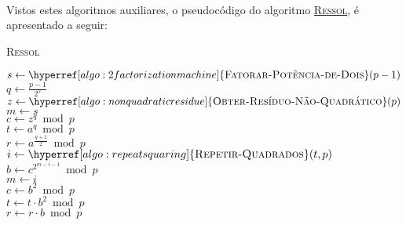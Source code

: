 \\
Vistos estes algoritmos auxiliares, o pseudocódigo do algoritmo \hyperref[algo:ressol]{\textsc{Ressol}}, é apresentado a seguir:
\begin{algorithm}[!htbp]
                \SetAlgoLined
                \caption{\textsc{Ressol}}
                \label{algo:ressol}
                \vspace{3mm}
                    {}
                    {}
                    {
                        {}
                        {}
                    }
                $s \leftarrow \hyperref[algo:2factorizationmachine]{\textsc{Fatorar-Potência-de-Dois}}(p-1)$
                \\
                $q \leftarrow \frac{p-1}{2^s}$
                \\
                $z \leftarrow \hyperref[algo:nonquadraticresidue]{\textsc{Obter-Resíduo-Não-Quadrático}}(p)$
                \\
                $m \leftarrow s$
                \\
                $c \leftarrow z^q \bmod{p}$
                \\
                $t \leftarrow a^q \bmod{p}$
                \\
                $r \leftarrow a^{\frac{q+1}{2}} \bmod{p}$
                \\
                {
                    $i \leftarrow \hyperref[algo:repeatsquaring]{\textsc{Repetir-Quadrados}}(t, p)$
                    \\
                    $b \leftarrow c^{2^{m - i - 1}} \bmod{p}$
                    \\
                    $m \leftarrow i$
                    \\
                    $c \leftarrow b^2 \bmod{p}$
                    \\
                    $t \leftarrow t \cdot b^2 \bmod{p}$
                    \\
                    $r \leftarrow r \cdot b \bmod{p}$
                }
    \end{algorithm}
\newpage
